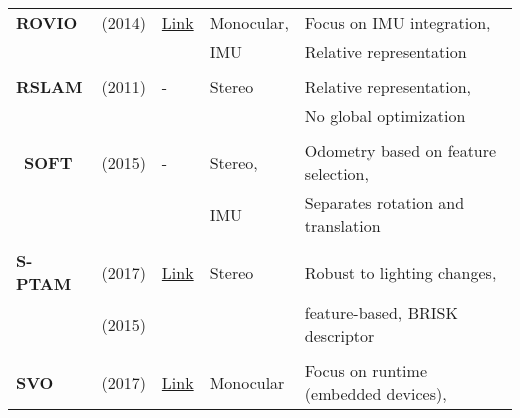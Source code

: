 {\begin{longtable}{l|l|l|l|l}
			\textbf{ROVIO}         & \cite{Bloesch2015} (2014)         & {\href{https://github.com/ethz-asl/rovio}{Link}}                   & Monocular,            & Focus on IMU integration,\\
			&                                   &                                                                    & IMU                   & Relative representation\\
			&                                   &                                                                    &                       &\\
			\textbf{RSLAM}         & \cite{Mei2011} (2011)             & -                                                                  & Stereo                & Relative representation,\\
			&                                   &                                                                    &                       & No global optimization \\
			&                                   &                                                                    &                       &\\\
			\textbf{SOFT}          & \cite{Cvisic2015} (2015)          & -                                                                  & Stereo,               & Odometry based on feature selection,\\
			&                                   &                                                                    & IMU                   & Separates rotation and translation\\
			&                                   &                                                                    &                       &\\
			\textbf{S-PTAM}        & \cite{Pire2017} (2017)            & {\href{https://github.com/lrse/sptam}{Link}}                       & Stereo                & Robust to lighting changes,\\
			& \cite{Pire2015} (2015)            &                                                                    &                       & feature-based, BRISK descriptor\\
			&                                   &                                                                    &                       &\\
			\textbf{SVO}           & \cite{7782863} (2017)         & {\href{https://github.com/uzh-rpg/rpg_svo}{Link}}                  & Monocular             & Focus on runtime (embedded devices),\\

\end{longtable}}
